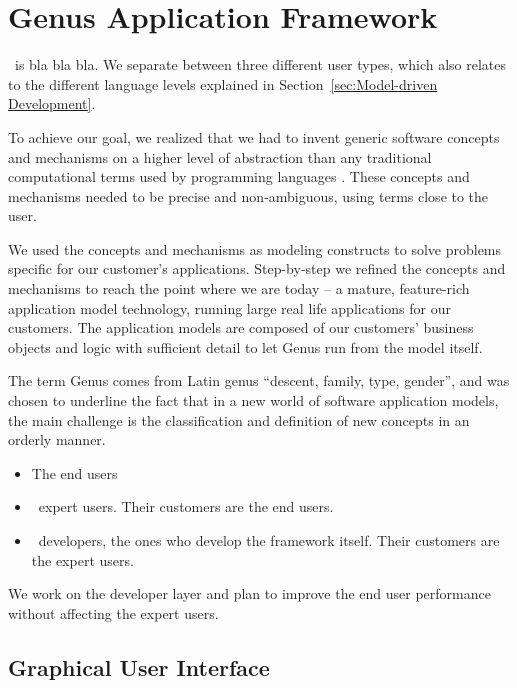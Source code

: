 \chapter{Genus Application Framework}
\label{chap:Genus Application Framework}
\genusSoftware~is bla bla bla. We separate between three different user types, which also relates to the different language levels explained in Section~\ref{sec:Model-driven Development}.

To achieve our goal, we realized that we had to invent generic software concepts and mechanisms on a higher level of abstraction than any traditional computational terms used by programming languages \cite{noauthor_undated-qy}. These concepts and mechanisms needed to be precise and non-ambiguous, using terms close to the user.
 
We used the concepts and mechanisms as modeling constructs to solve problems specific for our customer’s applications. Step-by-step we refined the concepts and mechanisms to reach the point where we are today – a mature, feature-rich application model technology, running large real life applications for our customers. The application models are composed of our customers' business objects and logic with sufficient detail to let Genus run from the model itself.
 
The term Genus comes from Latin genus “descent, family, type, gender”, and was chosen to underline the fact that in a new world of software application models, the main challenge is the classification and definition of new concepts in an orderly manner.

\begin{itemize}
    \item The end users
    \item \genusSoftware~expert users. Their customers are the end users.
    \item \genusSoftware~developers, the ones who develop the framework itself. Their customers are the expert users.
\end{itemize}

We work on the developer layer and plan to improve the end user performance without affecting the expert users.


\section{Graphical User Interface}
\label{sec:Graphical User Interface}

